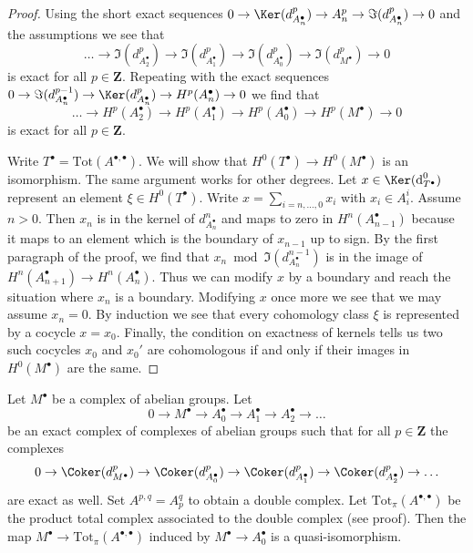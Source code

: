 \begin{proof}
Using the short exact sequences
$0 \to \Ker(d^p_{A_n^\bullet}) \to A_n^p \to \Im(d^p_{A_n^\bullet}) \to 0$
and the assumptions we see that
$$
\ldots \to \Im(d_{A_2^\bullet}^p) \to \Im(d_{A_1^\bullet}^p)
\to \Im(d_{A_0^\bullet}^p) \to \Im(d_{M^\bullet}^p) \to 0
$$
is exact for all $p \in \mathbf{Z}$. Repeating with the exact sequences
$0 \to \Im(d^{p - 1}_{A_n^\bullet}) \to \Ker(d^p_{A_n^\bullet})
\to H^p(A_n^\bullet) \to 0$ we find that
$$
\ldots \to H^p(A_2^\bullet) \to H^p(A_1^\bullet)
\to H^p(A_0^\bullet) \to H^p(M^\bullet) \to 0
$$
is exact for all $p \in \mathbf{Z}$.

\medskip\noindent
Write $T^\bullet = \text{Tot}(A^{\bullet, \bullet})$. We will show that
$H^0(T^\bullet) \to H^0(M^\bullet)$ is an isomorphism. The same argument
works for other degrees. Let $x \in \Ker(\text{d}_{T^\bullet}^0)$ represent
an element $\xi \in H^0(T^\bullet)$.
Write $x = \sum_{i = n, \ldots, 0} x_i$ with $x_i \in A_i^i$.
Assume $n > 0$. Then $x_n$ is in the kernel of $d_{A_n^\bullet}^n$
and maps to zero in $H^n(A_{n - 1}^\bullet)$ because it maps
to an element which is the boundary of $x_{n - 1}$ up to sign.
By the first paragraph of the proof, we find that
$x_n \bmod \Im(d^{n - 1}_{A_n^\bullet})$
is in the image of $H^n(A_{n + 1}^\bullet) \to H^n(A_n^\bullet)$.
Thus we can modify $x$ by a boundary and reach the situation
where $x_n$ is a boundary. Modifying $x$ once more we see that
we may assume $x_n = 0$. By induction we see that every cohomology
class $\xi$ is represented by a cocycle $x = x_0$.
Finally, the condition on exactness of kernels tells us
two such cocycles $x_0$ and $x_0'$ are cohomologous if
and only if their images in $H^0(M^\bullet)$ are the same.
\end{proof}

\begin{lemma}
\label{lemma-good-right-resolution-gives-qis}
Let $M^\bullet$ be a complex of abelian groups. Let
$$
0 \to M^\bullet \to A_0^\bullet \to A_1^\bullet \to A_2^\bullet \to \ldots
$$
be an exact complex of complexes of abelian groups
such that for all $p \in \mathbf{Z}$ the complexes
$$
0 \to
\Coker(d_{M^\bullet}^p) \to
\Coker(d_{A_0^\bullet}^p) \to
\Coker(d_{A_1^\bullet}^p) \to
\Coker(d_{A_2^\bullet}^p) \to \ldots
$$
are exact as well. Set $A^{p, q} = A_p^q$ to obtain a double
complex. Let $\text{Tot}_\pi(A^{\bullet, \bullet})$ be the
product total complex associated to the double complex
(see proof). Then the map
$M^\bullet \to \text{Tot}_\pi(A^{\bullet, \bullet})$
induced by $M^\bullet \to A_0^\bullet$ is a quasi-isomorphism.
\end{lemma}

